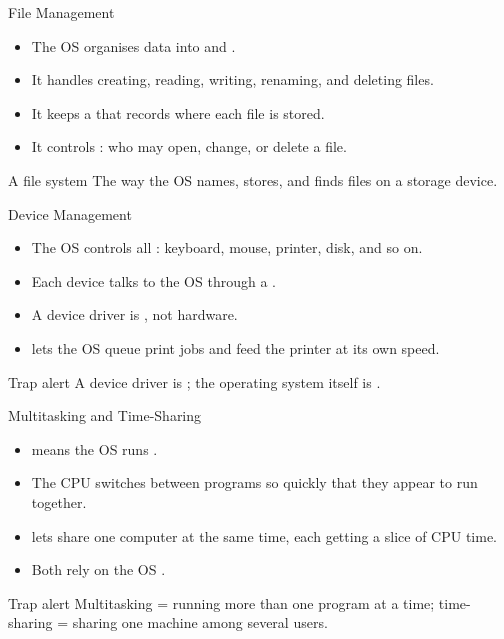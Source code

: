 \documentclass[aspectratio=169]{beamer}
\begin{document}
\begin{frame}{File Management}
  \begin{itemize}
    \item The OS organises data into  and .
    \item It handles creating, reading, writing, renaming, and deleting files.
    \item It keeps a  that records where each file is stored.
    \item It controls : who may open, change, or delete a
      file.
  \end{itemize}
  \begin{block}{A file system}
    The way the OS names, stores, and finds files on a storage device.
  \end{block}
\end{frame}

\begin{frame}{Device Management}
  \begin{itemize}
    \item The OS controls all : keyboard, mouse,
      printer, disk, and so on.
    \item Each device talks to the OS through a .
    \item A device driver is , not hardware.
    \item {} lets the OS queue print jobs and feed the printer at
      its own speed.
  \end{itemize}
  \begin{alertblock}{Trap alert}
    A device driver is ; the operating system itself is
    .
  \end{alertblock}
\end{frame}

\begin{frame}{Multitasking and Time-Sharing}
  \begin{itemize}
    \item {} means the OS runs .
    \item The CPU switches between programs so quickly that they appear to run
      together.
    \item {} lets  share one computer at the
      same time, each getting a slice of CPU time.
    \item Both rely on the OS .
  \end{itemize}
  \begin{alertblock}{Trap alert}
    Multitasking = running more than one program at a time; time-sharing =
    sharing one machine among several users.
  \end{alertblock}
\end{frame}
\end{document}
